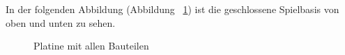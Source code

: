 In der folgenden Abbildung (Abbildung ~\ref{fig25}) ist die geschlossene Spielbasis von oben und unten zu sehen.

\vspace{1cm}
\begin{figure}[!ht]
	\centering
	\caption{Platine mit allen Bauteilen}
	\label{fig25}
\end{figure}
\vspace{0.5cm}









